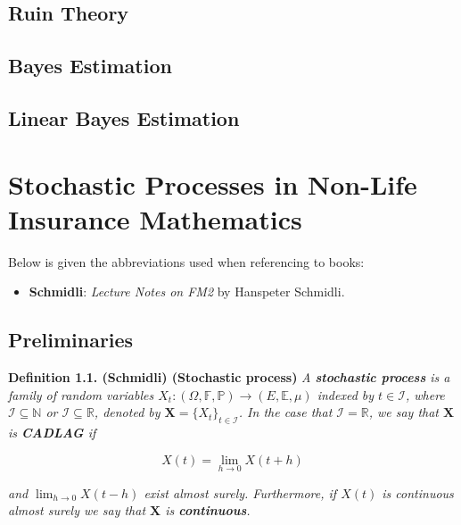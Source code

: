 \documentclass[a4paper,12pt,openany]{book}
\providecommand{\tightlist}{%
 \setlength{\itemsep}{0pt}\setlength{\parskip}{0pt}}
\begin{document}
\hypertarget{ruin-theory}{%
\section{Ruin Theory}\label{ruin-theory}}

\hypertarget{bayes-estimation}{%
\section{Bayes Estimation}\label{bayes-estimation}}

\hypertarget{linear-bayes-estimation}{%
\section{Linear Bayes Estimation}\label{linear-bayes-estimation}}

\hypertarget{stochastic-processes-in-non-life-insurance-mathematics}{%
\chapter{Stochastic Processes in Non-Life Insurance Mathematics}\label{stochastic-processes-in-non-life-insurance-mathematics}}

Below is given the abbreviations used when referencing to books:

\begin{itemize}
\tightlist
\item
  \textbf{Schmidli}: \emph{Lecture Notes on FM2} by Hanspeter Schmidli.\cite{schmidli}
\end{itemize}

\hypertarget{preliminaries}{%
\section{Preliminaries}\label{preliminaries}}

\textbf{Definition 1.1. (Schmidli) (Stochastic process)} \emph{A \textbf{stochastic process} is a family of random variables \(X_t : (\Omega,\mathbb F,\mathbb P) \to (E,\mathbb E,\mu)\) indexed by \(t\in \mathcal I\), where \(\mathcal I\subseteq \mathbb N\) or \(\mathcal I\subseteq \mathbb R\), denoted by \(\mathbf X=\{X_t\}_{t\in \mathcal I}\). In the case that \(\mathcal I=\mathbb R\), we say that \(\mathbf X\) is \textbf{CADLAG} if}

\[
X(t)=\lim_{h\to 0}X(t+h)
\]

\emph{and \(\lim_{h\to 0}X(t-h)\) exist almost surely. Furthermore, if \(X(t)\) is continuous almost surely we say that \(\mathbf X\) is \textbf{continuous}.}
\end{document}

